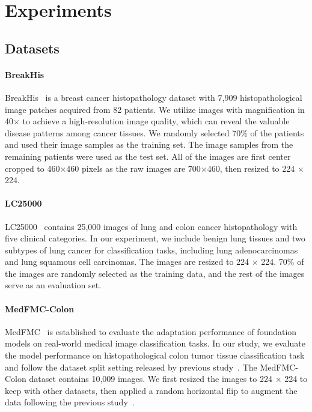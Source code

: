 \section{Experiments}
\subsection{Datasets}
\paragraph{BreakHis}
BreakHis~\cite{spanhol2015dataset} is a breast cancer histopathology dataset with 7,909 histopathological image patches acquired from 82 patients. We utilize images with magnification in 40${\times}$ to achieve a high-resolution image quality, which can reveal the valuable disease patterns among cancer tissues. We randomly selected 70\% of the patients and used their image samples as the training set. The image samples from the remaining patients were used as the test set. All of the images are first center cropped to 460${\times}$460 pixels as the raw images are 700${\times}$460, then resized to 224 ${\times}$ 224. 

\paragraph{LC25000}
LC25000~\cite{borkowski2019lung} contains 25,000 images of lung and colon cancer histopathology with five clinical categories. In our experiment, we include benign lung tissues and two subtypes of lung cancer for classification tasks, including lung adenocarcinomas and lung squamous cell carcinomas. The images are resized to 224 ${\times}$ 224. 70\% of the images are randomly selected as the training data, and the rest of the images serve as an evaluation set. 

\paragraph{MedFMC-Colon}
MedFMC~\cite{wang2023medfmc} is established to evaluate the adaptation performance of foundation models on real-world medical image classification tasks. In our study, we evaluate the model performance on histopathological colon tumor tissue classification task and follow the dataset split setting released by previous study~\cite{wang2023medfmc}. The MedFMC-Colon dataset contains 10,009 images. We first resized the images to 224 ${\times}$ 224 to keep with other datasets, then applied a random horizontal flip to augment the data following the previous study~\cite{wang2023medfmc}.




